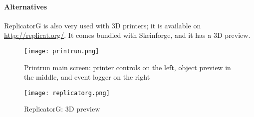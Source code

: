 \documentclass{article}
\begin{document}
	\paragraph{Alternatives} ReplicatorG is also very used with 3D printers; it is available on \url{http://replicat.org/}. It comes bundled with Skeinforge, and it has a 3D preview.

	\begin{figure}[h!]
		\centering
		\texttt{[image: printrun.png]}
		\caption{Printrun main screen: printer controls on the left, object preview in the middle, and event logger on the right}
	\end{figure}

	\begin{figure}[h!]
		\centering
		\texttt{[image: replicatorg.png]}
		\caption{ReplicatorG: 3D preview}
	\end{figure}
\end{document}
